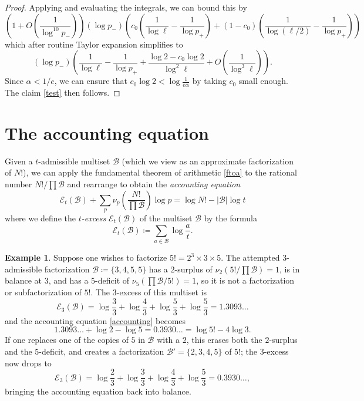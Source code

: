 \documentclass[10pt,a4paper,reqno]{amsart}
\numberwithin{equation}{section}
\theoremstyle{plain}
\theoremstyle{definition}
\newtheorem{example}[theorem]{Example}
\newcommand\tuple{{\mathcal B}}
\newcommand\excess{{\mathcal{E}}}
\begin{document}
\begin{proof}
Applying  and evaluating the integrals, we can bound this by
$$
\left( 1 + O\left(\frac{1}{\log^{10} p_-}\right)\right)
(\log p_-) \left( c_0 \left( \frac{1}{\log \ell} - \frac{1}{\log p_+} \right) + (1-c_0) \left( \frac{1}{\log(\ell/2)} - \frac{1}{\log p_+} \right) \right)$$
which after routine Taylor expansion simplifies to
$$ (\log p_-) \left(\frac{1}{\log \ell} - \frac{1}{\log p_+} + \frac{\log 2 - c_0 \log 2}{\log^2 \ell} + O\left( \frac{1}{\log^3 \ell}\right) \right).$$
Since $\alpha < 1/e$, we can ensure that $c_0 \log 2 < \log\frac{1}{e\alpha}$ by taking $c_0$ small enough.  The claim \eqref{test} then follows.
\end{proof}

\section{The accounting equation}\label{accounting-sec}

Given a $t$-admissible multiset $\tuple$ (which we view as an approximate factorization of $N!$), we can apply the fundamental theorem of arithmetic \eqref{ftoa} to the rational number  $N!/\prod \tuple$ and rearrange to obtain the \emph{accounting equation}
\begin{equation}\label{accounting} 
  \excess_t(\tuple) + \sum_p \nu_p\left( \frac{N!}{\prod \tuple} \right) \log p = \log N! - |\tuple| \log t
\end{equation}
where we define the \emph{$t$-excess} $\excess_t(\tuple)$ of the multiset $\tuple$ by the formula
\begin{equation}\label{excess-def}
  \excess_t(\tuple) \coloneqq \sum_{a \in \tuple} \log \frac{a}{t}.
\end{equation}

\begin{example} Suppose one wishes to factorize $5! = 2^3 \times 3 \times 5$.  The attempted $3$-admissible factorization $\tuple \coloneqq \{3,4,5,5\}$ has a $2$-surplus of $\nu_2(5!/\prod \tuple) = 1$, is in balance at $3$, and has a $5$-deficit of $\nu_5(\prod \tuple/5!) = 1$, so it is not a factorization or subfactorization of $5!$.  The $3$-excess of this multiset is
  $$ \excess_3(\tuple) = \log \frac{3}{3} + \log \frac{4}{3} + \log \frac{5}{3} + \log \frac{5}{3} = 1.3093\dots$$
  and the accounting equation \eqref{accounting} becomes
  $$ 1.3093\dots + \log 2 - \log 5 = 0.3930\dots = \log 5! - 4 \log 3.$$
  If one replaces one of the copies of $5$ in ${\mathcal B}$ with a $2$, this erases both the $2$-surplus and the $5$-deficit, and creates a factorization $\tuple' = \{2,3,4,5\}$ of $5!$; the $3$-excess now drops to
  $$ \excess_3(\tuple) = \log \frac{2}{3} + \log \frac{3}{3} + \log \frac{4}{3} + \log \frac{5}{3}  = 0.3930\dots,$$
  bringing the accounting equation back into balance.
\end{example}
  
\end{document}
